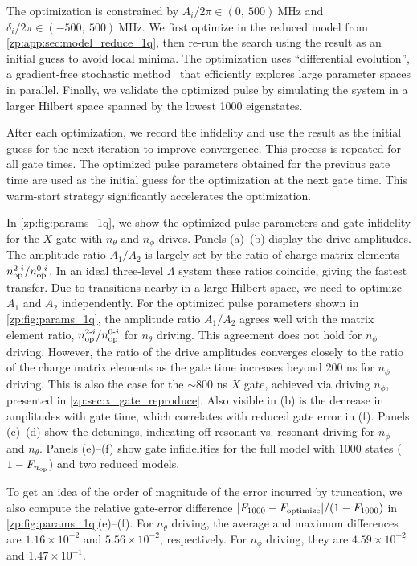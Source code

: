 The optimization is constrained by $A_i/2\pi \in (0,\ 500)\ \text{MHz}$ and $\delta_i/2\pi \in (-500,\ 500)\ \text{MHz}$.
We first optimize in the reduced model from \cref{zp:app:sec:model_reduce_1q}, then re-run the search using the result as an initial guess to avoid local minima.
The optimization uses ``differential evolution'', a gradient-free stochastic method~\cite{storn1997differential} that efficiently explores large parameter spaces in parallel.
Finally, we validate the optimized pulse by simulating the system in a larger Hilbert space spanned by the lowest 1000 eigenstates.

After each optimization, we record the infidelity and use the result as the initial guess for the next iteration to improve convergence.
This process is repeated for all gate times.
The optimized pulse parameters obtained for the previous gate time are used as the initial guess for the optimization at the next gate time.
This warm-start strategy significantly accelerates the optimization.

In \cref{zp:fig:params_1q}, we show the optimized pulse parameters and gate infidelity for the $X$ gate with $n_\theta$ and $n_\phi$ drives.
Panels (a)–(b) display the drive amplitudes.
The amplitude ratio $A_1/A_2$ is largely set by the ratio of charge matrix elements $n_{\rm op}^{2\text{-}i}/n_{\rm op}^{0\text{-}i}$.
In an ideal three-level $\Lambda$ system these ratios coincide, giving the fastest transfer.
Due to transitions nearby in a large Hilbert space, we need to optimize $A_1$ and $A_2$ independently.
For the optimized pulse parameters shown in \cref{zp:fig:params_1q}, the amplitude ratio  $A_1/A_2$ agrees well with the matrix element ratio, $n_{\rm op}^{2\text{-}i} / n_{\rm op}^{0\text{-}i}$ for $n_\theta$ driving.
This agreement does not hold for $n_\phi$ driving.
However, the ratio of the drive amplitudes converges closely to the ratio of the charge matrix elements as the gate time increases beyond 200 ns for $n_\phi$ driving.
This is also the case for the $\sim$800 ns $X$ gate, achieved via driving $n_\phi$, presented in \cref{zp:sec:x_gate_reproduce}.
Also visible in (b) is the decrease in amplitudes with gate time, which correlates with reduced gate error in (f).
Panels (c)–(d) show the detunings, indicating off-resonant vs. resonant driving for $n_\phi$ and $n_\theta$.
Panels (e)–(f) show gate infidelities for the full model with 1000 states ($1-F_{n_{\rm op}}$) and two reduced models.

To get an idea of the order of magnitude of the error incurred by truncation,  we also compute the relative gate-error difference $|F_{1000}-F_{\rm optimize}|/(1-F_{1000})$ in \cref{zp:fig:params_1q}(e)–(f).
For $n_\theta$ driving, the average and maximum differences are $1.16\times10^{-2}$ and $5.56\times10^{-2}$, respectively.
For $n_\phi$ driving, they are $4.59\times10^{-2}$ and $1.47\times10^{-1}$.


